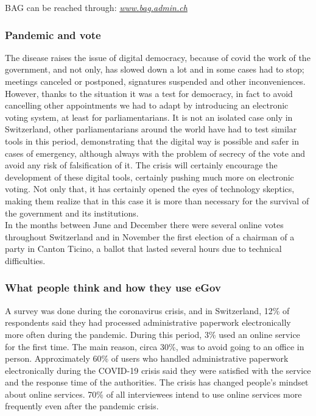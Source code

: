 BAG can be reached through: \href{https://www.bag.admin.ch/bag/en/home.html}{\emph{www.bag.admin.ch}}

\subsubsection*{Pandemic and vote}
The disease raises the issue of digital democracy, because of covid the work of the government, and not only, has slowed down a lot and in some cases had to stop; meetings canceled or postponed, signatures suspended and other inconveniences.
However, thanks to the situation it was a test for democracy, in fact to avoid cancelling other appointments we had to adapt by introducing an electronic voting system, at least for parliamentarians.
It is not an isolated case only in Switzerland, other parliamentarians around the world have had to test similar tools in this period, demonstrating that the digital way is possible and safer in cases of emergency, although always with the problem of secrecy of the vote and avoid any risk of falsification of it.
The crisis will certainly encourage the development of these digital tools, certainly pushing much more on electronic voting.
Not only that, it has certainly opened the eyes of technology skeptics, making them realize that in this case it is more than necessary for the survival of the government and its institutions.\\

In the months between June and December there were several online votes throughout Switzerland and in November the first election of a chairman of a party in Canton Ticino, a ballot that lasted several hours due to technical difficulties.

\subsubsection*{What people think and how they use eGov}
A survey was done during the coronavirus crisis, and in Switzerland, 12\% of respondents said they had processed administrative paperwork electronically more often during the pandemic. During this period, 3\% used an online service for the first time. The main reason, circa 30\%, was to avoid going to an office in person. Approximately 60\% of users who handled administrative paperwork electronically during the COVID-19 crisis said they were satisfied with the service and the response time of the authorities. The crisis has changed people's mindset about online services. 70\% of all interviewees intend to use online services more frequently even after the pandemic crisis.\cite{eGov2020Monitor}

